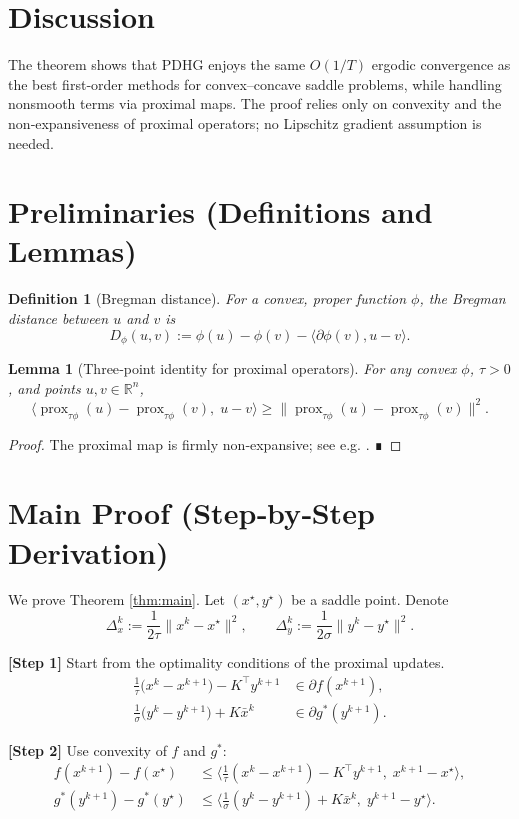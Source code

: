 \documentclass{article}
\newtheorem{lemma}{Lemma}
\newtheorem{definition}{Definition}
\newcommand{\prox}{\operatorname{prox}}
\begin{document}
\section*{Discussion}
The theorem shows that PDHG enjoys the same $O(1/T)$ ergodic convergence as the best first‑order methods for convex–concave saddle problems, while handling nonsmooth terms via proximal maps. The proof relies only on convexity and the non‑expansiveness of proximal operators; no Lipschitz gradient assumption is needed.

\section*{Preliminaries (Definitions and Lemmas)}
\begin{definition}[Bregman distance]
For a convex, proper function $\phi$, the Bregman distance between $u$ and $v$ is
\[
D_{\phi}(u,v):=\phi(u)-\phi(v)-\langle \partial\phi(v),u-v\rangle .
\]
\end{definition}
\begin{lemma}[Three‑point identity for proximal operators]\label{lem:three}
For any convex $\phi$, $\tau>0$, and points $u,v\in\mathbb R^{n}$,
\[
\langle \prox_{\tau\phi}(u)-\prox_{\tau\phi}(v),\;u-v\rangle
\ge \| \prox_{\tau\phi}(u)-\prox_{\tau\phi}(v)\|^{2}.
\tag{6}
\]
\end{lemma}
\begin{proof}
The proximal map is firmly non‑expansive; see e.g. \cite{bauschke2011convex}. ∎
\end{proof}

\section*{Main Proof (Step‑by‑Step Derivation)}
We prove Theorem \ref{thm:main}. Let $(x^{\star},y^{\star})$ be a saddle point. Denote
\[
\Delta_{x}^{k}:=\frac{1}{2\tau}\|x^{k}-x^{\star}\|^{2},
\qquad
\Delta_{y}^{k}:=\frac{1}{2\sigma}\|y^{k}-y^{\star}\|^{2}.
\]

\noindent\textbf{[Step 1]}  Start from the optimality conditions of the proximal updates.
\[
\begin{aligned}
\frac{1}{\tau}\big(x^{k}-x^{k+1}\big)-K^{\top}y^{k+1}&\in\partial f(x^{k+1}),\\
\frac{1}{\sigma}\big(y^{k}-y^{k+1}\big)+K\bar x^{k}&\in\partial g^{*}(y^{k+1}).
\end{aligned}
\tag{7}
\]

\noindent\textbf{[Step 2]}  Use convexity of $f$ and $g^{*}$:
\[
\begin{aligned}
f(x^{k+1})-f(x^{\star})
&\le \big\langle \frac{1}{\tau}(x^{k}-x^{k+1})-K^{\top}y^{k+1},\;x^{k+1}-x^{\star}\big\rangle,\\
g^{*}(y^{k+1})-g^{*}(y^{\star})
&\le \big\langle \frac{1}{\sigma}(y^{k}-y^{k+1})+K\bar x^{k},\;y^{k+1}-y^{\star}\big\rangle .
\end{aligned}
\tag{8}
\]
\end{document}
